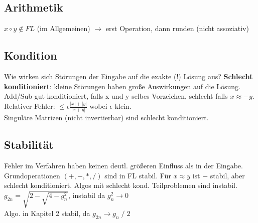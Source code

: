 \subsection{Arithmetik}
$x \circ y \notin FL$ (im Allgemeinen) $\rightarrow$ erst Operation, dann runden (nicht assoziativ)

\subsection{Kondition}
Wie wirken sich Störungen der Eingabe auf die exakte (!)
Lösung aus? \textbf{Schlecht konditioniert}: kleine Störungen haben große Auswirkungen auf die Lösung.\\
Add/Sub gut konditioniert, falls x und y selbes Vorzeichen, schlecht falls $x \approx -y$.\\
Relativer Fehler: $\leq \epsilon\frac{|x| + |y|}{|x+y|}$ wobei $\epsilon$ klein.\\
Singuläre Matrizen (nicht invertierbar) sind schlecht konditioniert.

\subsection{Stabilität}
Fehler im Verfahren haben keinen deutl. größeren Einfluss als in der Eingabe.\\
Grundoperationen $(+, -, *, /)$ sind in FL stabil.
Für $x \approx y$ ist $-$ stabil, aber schlecht konditioniert. Algos mit schlecht kond. Teilproblemen sind instabil.\\
$g_{2n} = \sqrt{2 -  \sqrt{4 - g_{n}^{2}}}$, instabil da $g_{n}^{2} \rightarrow 0$\\
Algo. in Kapitel 2 stabil, da $g_{2n} \rightarrow g_n \;/\; 2$\\